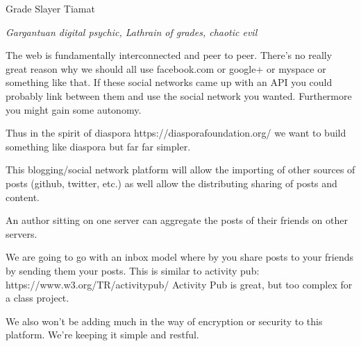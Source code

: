 \documentclass[../CMPUT-404-Notes.tex]{subfiles}
\begin{document}
\newpage

\begin{monsterbox}{Grade Slayer Tiamat}
    \begin{hangingpar}
        \textit{Gargantuan digital psychic, Lathrain of grades, chaotic evil}
    \end{hangingpar}
    \dndline
    \basics[
        armorclass = 33,
        hitpoints = 33,
        speed = {Weeks},
    ]
    \dndline
    \stats[
        STR = \stat{30},
        DEX = \stat{10},
        CON = \stat{30},
        INT = \stat{26},
        WIS = \stat{26},
        CHA = \stat{28},
    ]
    \dndline
    \details[
        languages = {Python, JavaScript, HTML, CSS},
        challenge = {30},
        senses = {darkvision 240 ft., truesight 120 ft.}
    ]
    \dndline
    The web is fundamentally interconnected and peer to peer. There’s no really great reason why we should all use facebook.com or google+ or myspace or something like that. If these social networks came up with an API you could probably link between them and use the social network you wanted. Furthermore you might gain some autonomy.

    Thus in the spirit of diaspora https://diasporafoundation.org/ we want to build something like diaspora but far far simpler.

    This blogging/social network platform will allow the importing of other sources of posts (github, twitter, etc.) as well allow the distributing sharing of posts and content.

    An author sitting on one server can aggregate the posts of their friends on other servers.

    We are going to go with an inbox model where by you share posts to your friends by sending them your posts. This is similar to activity pub: https://www.w3.org/TR/activitypub/ Activity Pub is great, but too complex for a class project.

    We also won’t be adding much in the way of encryption or security to this platform. We’re keeping it simple and restful.


\end{monsterbox}
\end{document}
